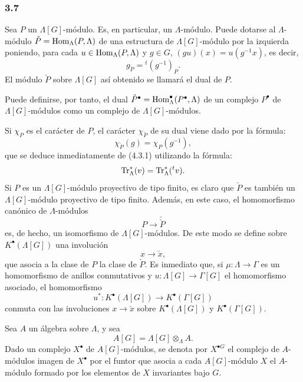 \subsubsection*{3.7}

Sea $P$ un $\Lambda[G]$-módulo. Es, en particular, un $\Lambda$-módulo. Puede dotarse al $\Lambda$-módulo $\check P=\operatorname{Hom}_\Lambda(P,\Lambda)$ de una estructura de $\Lambda[G]$-módulo por la izquierda poniendo, para cada $u\in\operatorname{Hom}_\Lambda(P,\Lambda)$ y $g\in G$, $(gu)(x)=u(g^{-1}x)$, es decir,
\[
g_{\check P}={}^{t}(g^{-1})_P.
\tag{3.7.1}
\]
El módulo $\check P$ sobre $\Lambda[G]$ así obtenido se llamará el dual de $P$.

Puede definirse, por tanto, el dual $\check P^\bullet=\operatorname{Hom}_\Lambda^\bullet(P^\bullet,\Lambda)$ de un complejo $P^\bullet$ de $\Lambda[G]$-módulos como un complejo de $\Lambda[G]$-módulos.

Si $\chi_P$ es el carácter de $P$, el carácter $\chi_{\check P}$ de su dual viene dado por la fórmula:
\[
\chi_{\check P}(g)=\chi_P(g^{-1}),
\tag{3.7.2}
\]
que se deduce inmediatamente de (4.3.1) utilizando la fórmula:
\[
\operatorname{Tr}_\Lambda^*(v)=\operatorname{Tr}_\Lambda^*({}^{t}v).
\]
Si $P$ es un $\Lambda[G]$-módulo proyectivo de tipo finito, es claro que $\check P$ es también un $\Lambda[G]$-módulo proyectivo de tipo finito. Además, en este caso, el homomorfismo canónico de $\Lambda$-módulos
\[
P\longrightarrow\check{\check P}
\]
es, de hecho, un isomorfismo de $\Lambda[G]$-módulos. De este modo se define sobre $K^{\bullet}(\Lambda[G])$ una involución
\[
x\longrightarrow \check x,
\]
que asocia a la clase de $P$ la clase de $\check P$. Es inmediato que, si $\mu:\Lambda\to\Gamma$ es un homomorfismo de anillos conmutativos y $u:\Lambda[G]\to\Gamma[G]$ el homomorfismo asociado, el homomorfismo
\[
u^*:K^{\bullet}(\Lambda[G])\longrightarrow K^{\bullet}(\Gamma[G])
\]
conmuta con las involuciones $x\longrightarrow \check x$ sobre $K^{\bullet}(\Lambda[G])$ y $K^{\bullet}(\Gamma[G])$.

Sea $A$ un álgebra sobre $\Lambda$, y sea
\[
A[G]=\Lambda[G]\otimes_\Lambda A.
\]
Dado un complejo $X^\bullet$ de $A[G]$-módulos, se denota por $X^{\bullet G}$ el complejo de $A$-módulos imagen de $X^\bullet$ por el funtor que asocia a cada $A[G]$-módulo $X$ el $A$-módulo formado por los elementos de $X$ invariantes bajo $G$.

